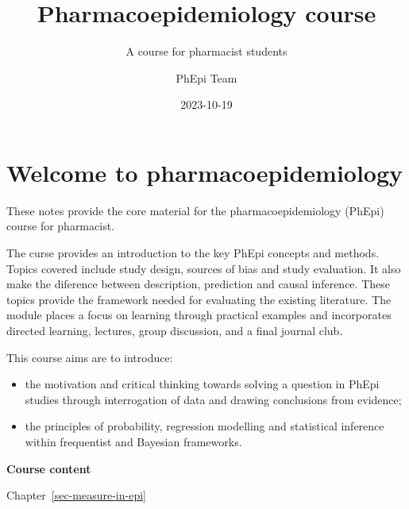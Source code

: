 \documentclass[
  letterpaper,
  paper=6in:9in,
  pagesize=pdftex,
  headinclude=on,
  footinclude=on,
  12pt]{scrbook}
\title{Pharmacoepidemiology course}
\subtitle{A course for pharmacist students}
\author{PhEpi Team}
\date{2023-10-19}
\providecommand{\tightlist}{%
  \setlength{\itemsep}{0pt}\setlength{\parskip}{0pt}}\usepackage{longtable,booktabs,array}
\renewcommand*\contentsname{Table of contents}
\newcommand\contentsname{Table of contents}
\begin{document}
\frontmatter
\maketitle


\renewcommand*\contentsname{Table of contents}
{
\setcounter{tocdepth}{2}
\tableofcontents
}

\mainmatter
{}

\chapter*{Welcome to
pharmacoepidemiology}\label{welcome-to-pharmacoepidemiology}


These notes provide the core material for the pharmacoepidemiology
(PhEpi) course for pharmacist.

The curse provides an introduction to the key PhEpi concepts and
methods. Topics covered include study design, sources of bias and study
evaluation. It also make the diference between description, prediction
and causal inference. These topics provide the framework needed for
evaluating the existing literature. The module places a focus on
learning through practical examples and incorporates directed learning,
lectures, group discussion, and a final journal club.

This course aims are to introduce:

\begin{itemize}
\tightlist
\item
  the motivation and critical thinking towards solving a question in
  PhEpi studies through interrogation of data and drawing conclusions
  from evidence;
\item
  the principles of probability, regression modelling and statistical
  inference within frequentist and Bayesian frameworks.
\end{itemize}

\textbf{Course content}

Chapter~\ref{sec-measure-in-epi}

\end{document}
